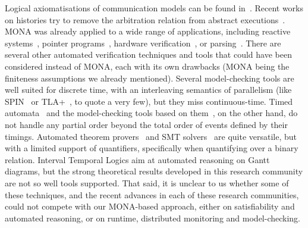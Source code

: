 Logical axiomatisations of communication models can be found in~\cite{DBLP:conf/fm/ChevrouH0Q19,DBLP:journals/pacmpl/GiustoFLL23,ENGELS2002253}.
Recent works on histories try to remove the arbitration relation from abstract executions~\cite{DBLP:journals/corr/abs-2510-21304}.
MONA was already applied to a wide range of applications, including reactive systems~\cite{KlaNieSun:casestudyautver}, pointer programs~\cite{JenJoeKlaSch:AutVerPoinProgMonSecOrdLog}, hardware verification~\cite{BasKla:BeyondFiniteHardware}, or parsing~\cite{YakYak99}.
There are several other automated verification techniques and tools that could have been considered instead of MONA, each with its own drawbacks (MONA being the finiteness assumptions we already mentioned).
Several model-checking tools are well suited for discrete time, with an interleaving semantics of parallelism (like SPIN~\cite{holzmann2007design} or TLA+~\cite{yu1999model}, to quote a very few), but they miss continuous-time.
Timed automata~\cite{alur1994theory} and the model-checking tools based on them~\cite{bengtsson1995uppaal,bozga1998kronos}, on the other hand, do not handle any partial order beyond the total order of events defined by their timings.
Automated theorem provers~\cite{kovacs2013first,weidenbach2009spass} and SMT solvers~\cite{de2008z3} are quite versatile, but with a limited support of quantifiers, specifically when quantifying over a binary relation. 
Interval Temporal Logics aim at automated reasoning on Gantt diagrams, but the strong theoretical results developed in this research community are not so well tools supported. 
That said, it is unclear to us whether some of these techniques, and the recent advances in each of these research communities, could not compete with our MONA-based approach, either on satisfiability and automated reasoning, or on runtime, distributed monitoring and model-checking.